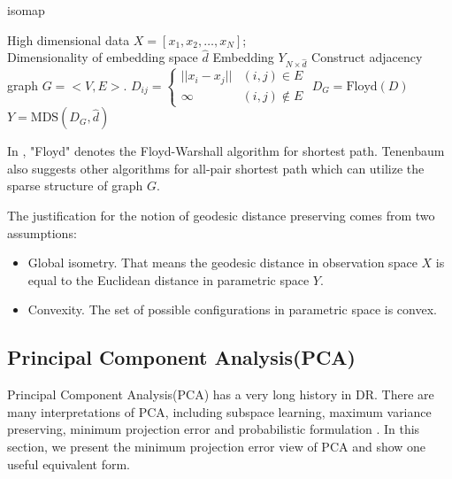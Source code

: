 \begin{algorithm}[htb]
	\caption{isomap}
	\label{alg:isomap}
	\begin{algorithmic}[1]
		\REQUIRE High dimensional data $X = [x_1, x_2, \ldots, x_N]$; \\
			Dimensionality of embedding space $ \hat{d} $
		\ENSURE Embedding $ Y_{N \times \hat{d}} $
		\STATE Construct adjacency graph $ G = <V, E> $. 
		\STATE $ D_{ij} = \left\lbrace \begin{array}{cc}
			||x_i - x_j|| & (i,j) \in E \\
			\infty & (i,j) \notin E
		\end{array} \right. $
		\STATE $ D_G = \text{Floyd}({D}) $
		\STATE $ Y = \text{MDS}(D_G, \hat{d}) $
	\end{algorithmic}
\end{algorithm}

In \ralg{\ref{alg:isomap}}, "Floyd" denotes the Floyd-Warshall algorithm \cite{wiki_floyd}
for shortest path. Tenenbaum also suggests other algorithms 
for all-pair shortest path which can utilize the sparse 
structure of graph $ G $\cite{tenenbaum2000isomap}. 

The justification for the notion of geodesic distance preserving 
comes from two assumptions:\cite{donoho2003hessian}
\begin{itemize}
	\item Global isometry. That means the geodesic distance 
	in observation space $ X $ is equal to the Euclidean distance 
	in parametric space $ Y $. 
	\item Convexity. The set of possible configurations 
	in parametric space is convex.  
\end{itemize}

\subsection{Principal Component Analysis(PCA)}
\label{sec:pca}

Principal Component Analysis(PCA)\cite{bishop2006pattern} has a very long history in 
DR. There are many interpretations of PCA, including 
subspace learning, maximum variance preserving, 
minimum projection error and probabilistic formulation
\cite{tipping1999probabilistic}. In this section, we present 
the minimum projection error view of PCA and show one useful equivalent
form. 

